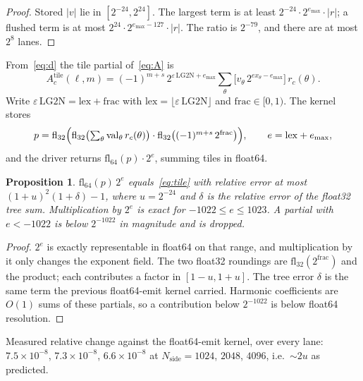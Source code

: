 \documentclass[11pt,a4paper]{article}
\newtheorem{proposition}[theorem]{Proposition}
\newcommand{\LG}{\mathrm{LG2N}}
\newcommand{\fl}[1]{\mathrm{fl}_{#1}}
\newcommand{\emax}{e_{\max}}
\numberwithin{equation}{section}
\begin{document}
\begin{proof}
Stored $\lvert v\rvert$ lie in $[2^{-24},2^{24}]$.  The largest term is at
least $2^{-24}\cdot 2^{\emax}\cdot\lvert r\rvert$; a flushed term is at most
$2^{24}\cdot 2^{\emax-127}\cdot\lvert r\rvert$.  The ratio is $2^{-79}$, and
there are at most $2^8$ lanes.
\end{proof}

From~\eqref{eq:d} the tile partial of~\eqref{eq:A} is
\begin{equation}
\label{eq:tile}
A_c^{\mathrm{tile}}(\ell,m)
  =(-1)^{m+s}\,
   2^{\varepsilon\,\LG+\emax}
   \sum_\theta
   \bigl[v_\theta\, 2^{ex_\theta-\emax}\bigr]\, r_c(\theta).
\end{equation}
Write $\varepsilon\,\LG=\mathrm{lex}+\mathrm{frac}$ with
$\mathrm{lex}=\lfloor\varepsilon\,\LG\rfloor$ and
$\mathrm{frac}\in[0,1)$.  The kernel stores
\begin{equation}
\label{eq:p}
p=\fl{32}\Bigl(\fl{32}\bigl(\textstyle\sum_\theta\mathrm{val}_\theta\, r_c(\theta)\bigr)
   \cdot\fl{32}\bigl((-1)^{m+s}\,2^{\mathrm{frac}}\bigr)\Bigr),
\qquad
e=\mathrm{lex}+\emax,
\end{equation}
and the driver returns $\fl{64}(p)\cdot 2^e$, summing tiles in float64.

\begin{proposition}
\label{prop:binade}
$\fl{64}(p)\,2^e$ equals~\eqref{eq:tile} with relative error at most
$(1+u)^2(1+\delta)-1$, where $u=2^{-24}$ and $\delta$ is the relative error
of the float32 tree sum.  Multiplication by $2^e$ is exact for
$-1022\le e\le 1023$.  A partial with $e<-1022$ is below $2^{-1022}$ in
magnitude and is dropped.
\end{proposition}

\begin{proof}
$2^e$ is exactly representable in float64 on that range, and multiplication
by it only changes the exponent field.  The two float32 roundings are
$\fl{32}(2^{\mathrm{frac}})$ and the product; each contributes a factor in
$[1-u,1+u]$.  The tree error $\delta$ is the same term the previous
float64-emit kernel carried.  Harmonic coefficients are $O(1)$ sums of
these partials, so a contribution below $2^{-1022}$ is below float64
resolution.
\end{proof}

Measured relative change against the float64-emit kernel, over every lane:
$7.5\times 10^{-8}$, $7.3\times 10^{-8}$, $6.6\times 10^{-8}$ at
$N_{\mathrm{side}}=1024$, $2048$, $4096$, i.e.\ $\sim 2u$ as predicted.
\end{document}
